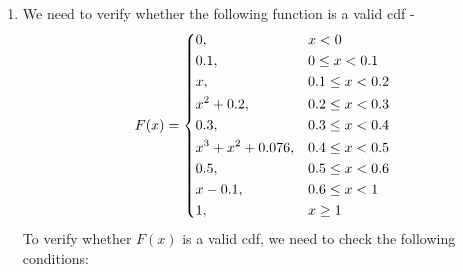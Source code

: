 \begin{enumerate}
\begin{enumerate}
    Calculating each integral, we get -
    \[\boxed{P(B) = \frac{5}{72} + \frac{5}{72} + \frac{5}{18} = \frac{25}{72}
    }\]
    \item We need to find $P(B \mid A)$. We have -
    \[P(B \mid A) = \frac{P(B \intersect A)}{P(A)}\]
    Since $B \intersect A$ is the event that one waits between 1 and 2 minutes inclusive, we have -
    \[P(B \intersect A) = \int_{1}^{1.5} \frac{4}{9}(x - 1/2) \, dx + \int_{1.5}^{2} \frac{4}{9}(5/2 - x) \, dx\]
    Calculating each integral, we get -
    \[\boxed{P(B \intersect A) = \frac{5}{72} + \frac{5}{72} = \frac{5}{36}
    }\]
    Thus, we have -
    \[\boxed{P(B \mid A) = \frac{\frac{5}{36}}{\frac{25}{72}} = \frac{5}{36} \cdot \frac{72}{25} = \frac{10}{25} = \frac{2}{5}
    }\]
    \item We need to find $P(A^C \mid B^C)$. We have -
    \[P(A^C \mid B^C) = \frac{P(A^C \intersect B^C)}{P(B^C)} = \frac{P((A \union B)^C)}{1 - P(B)}\]
    Since $A \union B$ is the event that one waits between 0 and 3 minutes inclusive, we have -
    \[P(A \union B) = \int_{0}^{1} \frac{1}{9}(x+1) \, dx + \int_{1}^{1.5} \frac{4}{9}(x - 1/2) \, dx + \int_{1.5}^{2} \frac{4}{9}(5/2 - x) \, dx + \int_{2}^{3} \frac{1}{9}(4-x) \, dx\]
    Calculating each integral, we get -
    \[\boxed{P(A \union B) = \frac{5}{18} + \frac{5}{72} + \frac{5}{72} + \frac{5}{18} = \frac{50}{72} = \frac{25}{36}
    }\]
    Thus, we have -
    \[\boxed{P(A^C \mid B^C) = \frac{1 - \frac{25}{36}}{1 - \frac{25}{72}} = \frac{\frac{11}{36}}{\frac{47}{72}} = \frac{11}{36} \cdot \frac{72}{47} = \frac{22}{47}
    }\]
\end{enumerate}
    \item We need to verify whether the following function is a valid cdf - \\
    $$F(x) = \begin{dcases}
        0, & x < 0 \\
        0.1, & 0 \leq x < 0.1 \\
        x, & 0.1 \leq x < 0.2 \\
        x^2 + 0.2, & 0.2 \leq x < 0.3 \\
        0.3, & 0.3 \leq x < 0.4 \\
        x^3 + x^2 + 0.076, & 0.4 \leq x < 0.5 \\
        0.5, & 0.5 \leq x < 0.6 \\
        x - 0.1, & 0.6 \leq x < 1 \\
        1, & x \geq 1
    \end{dcases}
$$
To verify whether $F(x)$ is a valid cdf, we need to check the following conditions:

\end{enumerate}
